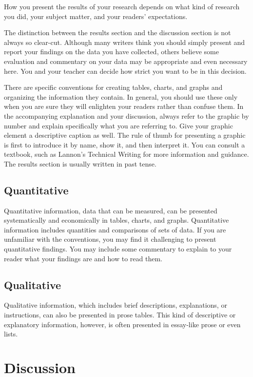 \documentclass{article}
\begin{document}
How you present the results of your research depends on what kind of
research you did, your subject matter, and your readers’
expectations. 

The distinction between the results section and the discussion section
is not always so clear-cut. Although many writers think you should
simply present and report your findings on the data you have
collected, others believe some evaluation and commentary on your data
may be appropriate and even necessary here. You and your teacher can
decide how strict you want to be in this decision.

There are specific conventions for creating tables, charts, and graphs
and organizing the information they contain. In general, you should
use these only when you are sure they will enlighten your readers
rather than confuse them. In the accompanying explanation and your
discussion, always refer to the graphic by number and explain
specifically what you are referring to. Give your graphic element a
descriptive caption as well. The rule of thumb for presenting a
graphic is first to introduce it by name, show it, and then interpret
it. You can consult a textbook, such as Lannon’s Technical Writing for
more information and guidance. The results section is usually written
in past tense.

\subsection{Quantitative\label{sec:quant}}
Quantitative information, data that can be measured, can
be presented systematically and economically in tables, charts, and
graphs. Quantitative information includes quantities and comparisons
of sets of data. If you are unfamiliar with the conventions, you may
find it challenging to present quantitative findings. You may include
some commentary to explain to your reader what your findings are and
how to read them.

\subsection{Qualitative\label{sec:qual}}
Qualitative information, which includes brief descriptions,
explanations, or instructions, can also be presented in prose
tables. This kind of descriptive or explanatory information, however,
is often presented in essay-like prose or even lists.

\section{Discussion\label{sec:discuss}}
\end{document}
